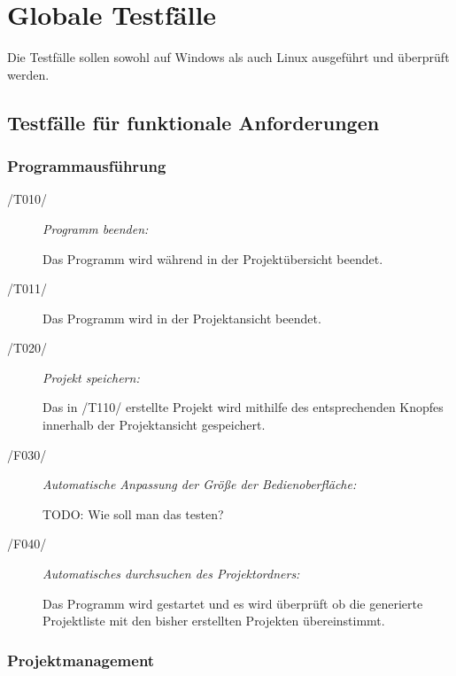 \section{Globale Testfälle}

Die Testfälle sollen sowohl auf Windows als auch Linux ausgeführt und überprüft werden.


\subsection{Testfälle für funktionale Anforderungen}
	
	\subsubsection{Programmausführung}
	
		\begin{description}

			\item[/T010/] \textit{Programm beenden:}\par Das Programm wird während in der Projektübersicht beendet.
			\item[/T011/] Das Programm wird in der Projektansicht beendet.
				
			\item[/T020/] \textit{Projekt speichern:}\par Das in /T110/ erstellte Projekt wird mithilfe des entsprechenden Knopfes innerhalb der Projektansicht gespeichert. 
				
			\item[/F030/] \textit{Automatische Anpassung der Größe der Bedienoberfläche:}\par TODO: Wie soll man das testen?	
				
			\item[/F040/] \textit{Automatisches durchsuchen des Projektordners:}\par Das Programm wird gestartet und es wird überprüft ob die generierte Projektliste mit den bisher erstellten Projekten übereinstimmt.
		
		\end{description}

	\subsubsection{Projektmanagement}
	
